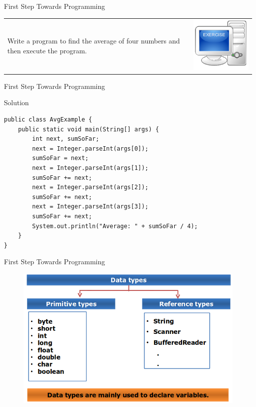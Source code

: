 \documentclass[14pt]{beamer}
\begin{document}
\begin{frame}[fragile]{First Step Towards Programming}
\begin{tabular}{p{8cm} r}
 Write a program to find the average of four numbers and then execute the program. & \includegraphics[scale=.4]{exercise.png} \\
 \end{tabular}
\end{frame}
\begin{frame}[fragile]{First Step Towards Programming}
\begin{block}{Solution} 
\begin{lstlisting}
public class AvgExample {
    public static void main(String[] args) {
        int next, sumSoFar;
        next = Integer.parseInt(args[0]);
        sumSoFar = next;
        next = Integer.parseInt(args[1]);
        sumSoFar += next;
        next = Integer.parseInt(args[2]);
        sumSoFar += next;
        next = Integer.parseInt(args[3]);
        sumSoFar += next;
        System.out.println("Average: " + sumSoFar / 4);
    }
}
 \end{lstlisting}
 \end{block}
\end{frame}

\begin{frame}{First Step Towards Programming}
\begin{figure}[H]
\begin{center}
 \includegraphics[scale=.3]{data-types.png}
\end{center}
\end{figure}
\end{frame}
\end{document}
